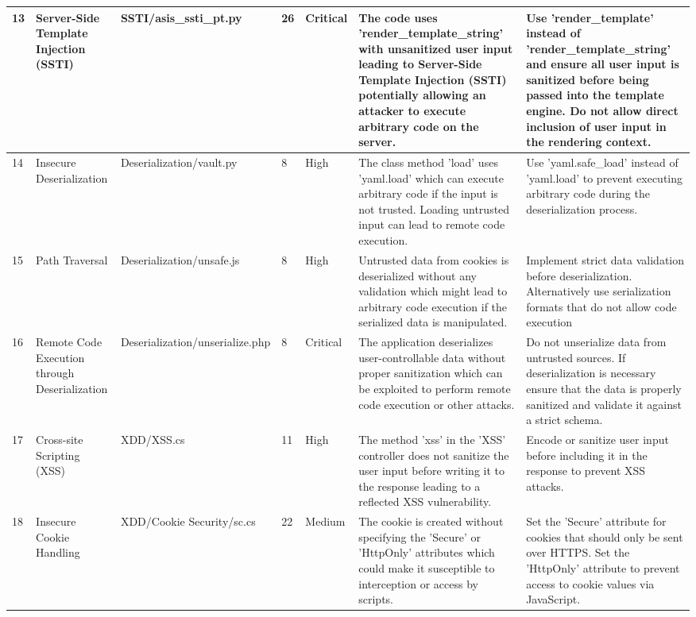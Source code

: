 \begin{landscape}
\begin{table}[!htbp]
{\begin{tabular}{|l|p{4cm}|p{3cm}|p{2cm}|p{1.5cm}|p{12cm}|p{9cm}|}
      13 & Server-Side Template Injection (SSTI) & SSTI/asis\_ssti\_pt.py & 26 & Critical & The code uses 'render\_template\_string' with unsanitized user input leading to Server-Side Template Injection (SSTI) potentially allowing an attacker to execute arbitrary code on the server. & Use 'render\_template' instead of 'render\_template\_string' and ensure all user input is sanitized before being passed into the template engine. Do not allow direct inclusion of user input in the rendering context. \\ \hline
      14 & Insecure Deserialization & Deserialization/vault.py & 8 & High & The class method 'load' uses 'yaml.load' which can execute arbitrary code if the input is not trusted. Loading untrusted input can lead to remote code execution. & Use 'yaml.safe\_load' instead of 'yaml.load' to prevent executing arbitrary code during the deserialization process. \\ \hline
      15 & Path Traversal & Deserialization/unsafe.js & 8 & High & Untrusted data from cookies is deserialized without any validation which might lead to arbitrary code execution if the serialized data is manipulated. & Implement strict data validation before deserialization. Alternatively  use serialization formats that do not allow code execution \\ \hline
      16 & Remote Code Execution through Deserialization & Deserialization/unserialize.php & 8 & Critical & The application deserializes user-controllable data without proper sanitization which can be exploited to perform remote code execution or other attacks. & Do not unserialize data from untrusted sources. If deserialization is necessary ensure that the data is properly sanitized and validate it against a strict schema. \\ \hline
      17 & Cross-site Scripting (XSS) & XDD/XSS.cs & 11 & High & The method 'xss' in the 'XSS' controller does not sanitize the user input before writing it to the response leading to a reflected XSS vulnerability. & Encode or sanitize user input before including it in the response to prevent XSS attacks. \\ \hline
      18 & Insecure Cookie Handling & XDD/Cookie Security/sc.cs & 22 & Medium & The cookie is created without specifying the 'Secure' or 'HttpOnly' attributes which could make it susceptible to interception or access by scripts. & Set the 'Secure' attribute for cookies that should only be sent over HTTPS. Set the 'HttpOnly' attribute to prevent access to cookie values via JavaScript. \\ \hline

\end{tabular}}
\end{table}
\end{landscape}
